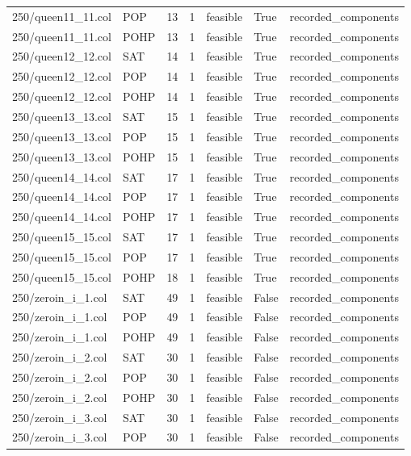 \begin{table}[htbp]
\begin{tabular}{lllllll}
250/queen11\_11.col & POP & 13 & 1 & feasible & True & recorded\_components \\
250/queen11\_11.col & POHP & 13 & 1 & feasible & True & recorded\_components \\
250/queen12\_12.col & SAT & 14 & 1 & feasible & True & recorded\_components \\
250/queen12\_12.col & POP & 14 & 1 & feasible & True & recorded\_components \\
250/queen12\_12.col & POHP & 14 & 1 & feasible & True & recorded\_components \\
250/queen13\_13.col & SAT & 15 & 1 & feasible & True & recorded\_components \\
250/queen13\_13.col & POP & 15 & 1 & feasible & True & recorded\_components \\
250/queen13\_13.col & POHP & 15 & 1 & feasible & True & recorded\_components \\
250/queen14\_14.col & SAT & 17 & 1 & feasible & True & recorded\_components \\
250/queen14\_14.col & POP & 17 & 1 & feasible & True & recorded\_components \\
250/queen14\_14.col & POHP & 17 & 1 & feasible & True & recorded\_components \\
250/queen15\_15.col & SAT & 17 & 1 & feasible & True & recorded\_components \\
250/queen15\_15.col & POP & 17 & 1 & feasible & True & recorded\_components \\
250/queen15\_15.col & POHP & 18 & 1 & feasible & True & recorded\_components \\
250/zeroin\_i\_1.col & SAT & 49 & 1 & feasible & False & recorded\_components \\
250/zeroin\_i\_1.col & POP & 49 & 1 & feasible & False & recorded\_components \\
250/zeroin\_i\_1.col & POHP & 49 & 1 & feasible & False & recorded\_components \\
250/zeroin\_i\_2.col & SAT & 30 & 1 & feasible & False & recorded\_components \\
250/zeroin\_i\_2.col & POP & 30 & 1 & feasible & False & recorded\_components \\
250/zeroin\_i\_2.col & POHP & 30 & 1 & feasible & False & recorded\_components \\
250/zeroin\_i\_3.col & SAT & 30 & 1 & feasible & False & recorded\_components \\
250/zeroin\_i\_3.col & POP & 30 & 1 & feasible & False & recorded\_components \\

\end{tabular}
\end{table}
